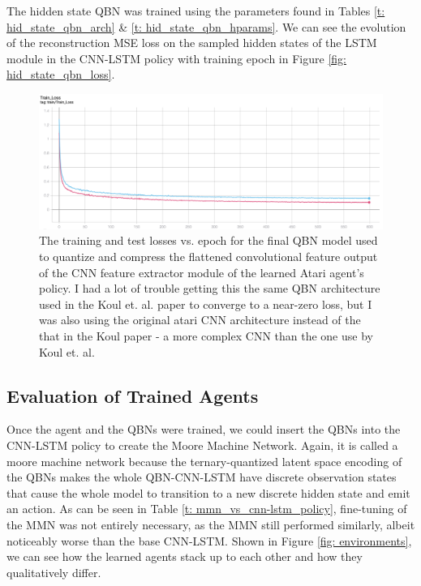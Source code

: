 The hidden state QBN was trained using the parameters found in Tables \ref{t: hid_state_qbn_arch} \& \ref{t: hid_state_qbn_hparams}. We can see the evolution of the reconstruction MSE loss on the sampled hidden states of the LSTM module in the CNN-LSTM policy with training epoch in Figure \ref{fig: hid_state_qbn_loss}.

\begin{figure}
    \centering
    \includegraphics[width=\textwidth]{Figures/obs_qbn_loss.png}
    \caption{The training and test losses vs. epoch for the final QBN model used to quantize and compress the flattened convolutional feature output of the CNN feature extractor module of the learned Atari agent's policy. I had a lot of trouble getting this the same QBN architecture used in the Koul et. al. paper \cite{Koul2019} to converge to a near-zero loss, but I was also using the original atari CNN architecture \cite{nature_q_learning} instead of the that in the Koul paper - a more complex CNN than the one use by Koul et. al.}
    \label{fig: obs_qbn_loss}
\end{figure}


\subsection{Evaluation of Trained Agents}

Once the agent and the QBNs were trained, we could insert the QBNs into the CNN-LSTM policy to create the Moore Machine Network. Again, it is called a moore machine network because the ternary-quantized latent space encoding of the QBNs makes the whole QBN-CNN-LSTM have discrete observation states that cause the whole model to transition to a new discrete hidden state and emit an action. As can be seen in Table \ref{t: mmn_vs_cnn-lstm_policy}, fine-tuning of the MMN was not entirely necessary, as the MMN still performed similarly, albeit noticeably worse than the base CNN-LSTM. Shown in Figure \ref{fig: environments}, we can see how the learned agents stack up to each other and how they qualitatively differ.

